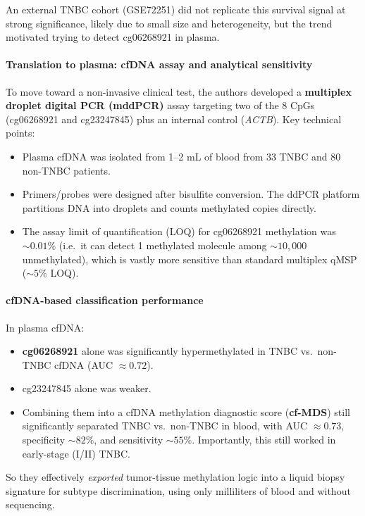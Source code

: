 \documentclass[10pt]{extarticle}
\begin{document}
An external TNBC cohort (GSE72251) did not replicate this survival signal at strong significance, likely due to small size and heterogeneity, but the trend motivated trying to detect cg06268921 in plasma. 

\paragraph{Translation to plasma: cfDNA assay and analytical sensitivity}
To move toward a non-invasive clinical test, the authors developed a \textbf{multiplex droplet digital PCR (mddPCR)} assay targeting two of the 8 CpGs (cg06268921 and cg23247845) plus an internal control (\textit{ACTB}). Key technical points:
\begin{itemize}[label=-]
    \item Plasma cfDNA was isolated from 1--2 mL of blood from 33 TNBC and 80 non-TNBC patients.
    \item Primers/probes were designed after bisulfite conversion. The ddPCR platform partitions DNA into droplets and counts methylated copies directly.
    \item The assay limit of quantification (LOQ) for cg06268921 methylation was \(\sim 0.01\%\) (i.e.\ it can detect 1 methylated molecule among \(\sim 10{,}000\) unmethylated), which is vastly more sensitive than standard multiplex qMSP (\(\sim 5\%\) LOQ). 
\end{itemize}

\paragraph{cfDNA-based classification performance}
In plasma cfDNA:
\begin{itemize}[label=-]
    \item \textbf{cg06268921} alone was significantly hypermethylated in TNBC vs.\ non-TNBC cfDNA (AUC \(\approx 0.72\)).
    \item cg23247845 alone was weaker.
    \item Combining them into a cfDNA methylation diagnostic score (\textbf{cf-MDS}) still significantly separated TNBC vs.\ non-TNBC in blood, with AUC \(\approx 0.73\), specificity \(\sim 82\%\), and sensitivity \(\sim 55\%\). Importantly, this still worked in early-stage (I/II) TNBC.
    
\end{itemize}

So they effectively \textit{exported} tumor-tissue methylation logic into a liquid biopsy signature for subtype discrimination, using only milliliters of blood and without sequencing.
\end{document}
